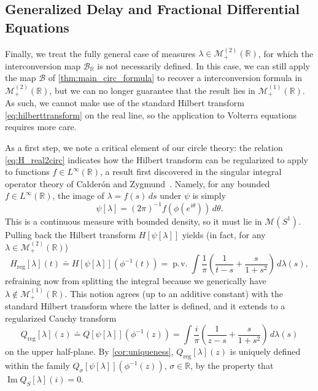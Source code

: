\documentclass{cams-l} %
\newcommand{\dave}[1]{#1}\newcommand{\davebegin}{}\newcommand{\daveend}{}\newcommand{\george}[1]{#1}
\newcommand{\RR}{\mathbb R}
\newcommand{\cM}{\mathcal M}
\newcommand{\cB}{\mathcal B}
\newcommand{\op}{\operatorname}
\newcommand{\pv}{\op{p.\!v.}}
\renewcommand{\Im}{\op{Im}}
\theoremstyle{definition}
\theoremstyle{remark}
\numberwithin{equation}{section}
\begin{document}
\subsection{Generalized Delay and Fractional Differential Equations}\label{sec:regularizedH}
Finally, we \dave{treat} the fully general case of measures $\lambda\in\cM_+^{(2)}(\RR)$, for which the interconversion map $\cB_\RR$ is not necessarily defined. In this case, we can still apply the map $\cB$ of \cref{thm:main_circ_formula} to recover a interconversion formula in $\cM_+^{(2)}(\RR)$, but we can no longer guarantee that the result lies in $\cM_+^{(1)}(\RR)$. As such, we cannot make use of the standard Hilbert transform \cref{eq:hilberttransform} on the real line, so the application to Volterra equations requires more care.

As a first step, we note a critical \dave{element} of our circle theory: the relation \cref{eq:H_real2circ} \dave{indicates} how the Hilbert transform can be regularized to apply to functions $f\in L^\infty(\RR)$, a result \dave{first discovered in the singular integral operator theory of Calder\'on and Zygmund}~\cite{10.1007/BF02392130}. Namely, for any bounded $f\in L^\infty(\RR)$, the image of $\lambda = f(s)\,ds$ under $\psi$ is simply
    \[\psi[\lambda] = (2\pi)^{-1}f(\phi(e^{i\theta}))\,d\theta .\]
    This is a continuous measure with bounded density, so it must lie in $\cM(S^1)$. Pulling back the Hilbert transform $H[\psi[\lambda]]$ yields (in fact, for any $\lambda\in\cM_+^{(2)}(\RR)$)
    \begin{equation}\label{eq:regularizedH}
        H_\mathrm{reg}[\lambda](t)\doteq H[\psi[\lambda]](\phi^{-1}(t)) = \pv\int \frac{1}{\pi}\left(\frac{1}{t-s} + \frac{s}{1+s^2}\right)\,d\lambda(s),
    \end{equation}
    refraining now from splitting the integral because we generically have $\lambda\notin\cM_+^{(1)}(\RR)$. \dave{This notion agrees (up to an additive constant) with the standard Hilbert transform where the latter is defined, and it extends to a regularized Cauchy transform}
    \begin{equation}\label{eq:regularizedQ}
        Q_\mathrm{reg}[\lambda](z)\doteq Q[\psi[\lambda]](\phi^{-1}(z)) = \int \frac{i}{\pi}\left(\frac{1}{z-s} + \frac{s}{1+s^2}\right)\,d\lambda(s)
    \end{equation}
    on the upper half-plane. By \cref{cor:uniqueness}, $Q_\mathrm{reg}[\lambda](z)$ is uniquely defined within the family $Q_\sigma[\psi[\lambda]](\phi^{-1}(z))$, $\sigma\in\RR$, by the property that $\Im Q_S[\lambda](i) = 0$.
\end{document}
